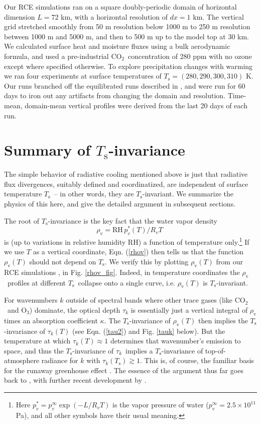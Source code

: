 \documentclass[10pt]{article}
\newcommand{\beqn}{\begin{equation}}
\newcommand{\eeqn}{\end{equation}}
\newcommand{\eqnref}[1]{(\ref{#1})}
\newcommand{\cotwo}{\ensuremath{\mathrm{CO_2}}}
\newcommand{\othree}{\ensuremath{\mathrm{O_3}}}
\newcommand{\tauk}{\ensuremath{\tau_k}}
\newcommand{\rhov}{\ensuremath{\rho_\mathrm{v}}}
\newcommand{\Ts}{\ensuremath{T_\mathrm{s}}}
\newcommand{\RH}{\ensuremath{\mathrm{RH}}}
\begin{document}
	Our RCE simulations ran on a square doubly-periodic domain of horizontal dimension $L=72$ km, with  a horizontal resolution of $dx=1$ km. The vertical grid stretched smoothly from 50 m resolution below 1000 m to 250 m resolution between 1000 m and 5000 m, and then to 500 m up to the model top at  30 km. We calculated surface heat and moisture fluxes using a bulk aerodynamic formula, and used a pre-industrial \cotwo\  concentration of 280 ppm with no ozone except where specified otherwise. To explore precipitation changes  with warming we ran four experiments at surface temperatures of $\Ts=(280,290,300,310)$ K. Our runs branched off the equilibrated runs described in \cite{romps2014}, and were run for 60 days  to iron out any artifacts from changing the domain and resolution. Time-mean,  domain-mean vertical profiles were derived from the last 20 days  of each run. 
	



\section{Summary of \Ts-invariance}
The simple behavior of radiative cooling mentioned above is just that radiative flux divergences, suitably defined and  coordinatized, are independent of surface temperature \Ts\ -- in other words, they are \Ts-invariant. We summarize the physics of this here, and give the detailed argument in subsequent sections.

The root of \Ts-invariance is the key fact that  the water vapor density 
	\beqn
		\rhov =  \RH\, p_v^*(T)/R_ vT \; 
	\label{rhov}
	\eeqn
	 is (up to variations in relative humidity \RH) a function of temperature only.\footnote{Here $p_v^* = p_v^\infty \exp(-L/R_vT)$ is the vapor pressure of water ($p_v^\infty = 2.5\times 10^{11} $ Pa), and all other symbols have their usual meaning.} If we use $T$ as a vertical coordinate,  Eqn. \eqnref{rhov} then tells us that the function $\rhov(T)$ should not depend on \Ts.  We verify this by plotting $\rhov(T)$  from our RCE simulations \citep[in which \RH\ does vary, but is a function of $T$ only; cf][]{romps2014},  in Fig. \ref{rhov_fig}. Indeed, in temperature coordinates the \rhov\ profiles at different \Ts\ collapse onto a single curve, i.e. $\rhov(T)$ is \Ts-invariant.
	 
	For wavenumbers $k$ outside of spectral bands where other trace gases (like \cotwo\ and \othree) dominate, the optical depth $\tauk$ is essentially just a vertical integral of $\rhov$  times an absorption coefficient $\kappa$. The \Ts-invariance of $\rhov(T)$ then implies the \Ts-invariance of $\tauk(T)$ (see Eqn. \eqnref{tau2} and Fig. \ref{tauk} below). But the temperature at which $\tauk(T)\approx 1$  determines that wavenumber's emission to space, and thus the \Ts-invariance of \tauk\ implies a \Ts-invariance of top-of-atmosphere radiance for $k$ with $\tauk(\Ts) \gtrsim 1$. This is, of course, the familiar basis for the runaway greenhouse effect \citep[e.g.][]{goldblatt2013}.  The essence of the argument thus far goes back to \cite{simpson1928}, with further recent development by \cite{ingram2010}.
  
\end{document}
